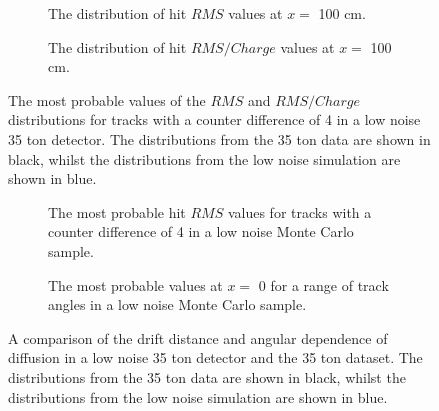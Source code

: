 \begin{figure}[h!]
  \centering
  \begin{subfigure}{0.45\textwidth}
    \centering
    \caption{The distribution of hit $RMS$ values at $x =$ 100 cm.}
  \end{subfigure}
  \hspace{0.08\textwidth}
  \begin{subfigure}{0.45\textwidth}
    \centering
    \caption{The distribution of hit $RMS/Charge$ values at $x =$ 100 cm.}
  \end{subfigure}
  \caption[The most probable values of the $RMS$ and $RMS/Charge$ distributions for tracks with a counter difference of 4 in a low noise 35 ton detector]
          {The most probable values of the $RMS$ and $RMS/Charge$ distributions for tracks with a counter difference of 4 in a low noise 35 ton detector. The distributions from the 35 ton data are shown in black, whilst the distributions from the low noise simulation are shown in blue.}
          \label{fig:DiffMCHitFit}
\end{figure}

\begin{figure}[h!]
  \centering
  \begin{subfigure}{0.45\textwidth}
    \centering
    \caption{The most probable hit $RMS$ values for tracks with a counter difference of 4 in a low noise Monte Carlo sample.}
    \label{fig:DiffMCDataCompFit}
  \end{subfigure}
  \hspace{0.08\textwidth}
  \begin{subfigure}{0.45\textwidth}
    \centering
    \caption{The most probable values at $x = $ 0 for a range of track angles in a low noise Monte Carlo sample.}
    \label{fig:DiffMCDataCompInt}
  \end{subfigure}
  \caption[Comparison of the drift distance and angular dependence of diffusion in a low noise 35 ton detector and the 35 ton dataset]
          {A comparison of the drift distance and angular dependence of diffusion in a low noise 35 ton detector and the 35 ton dataset. The distributions from the 35 ton data are shown in black, whilst the distributions from the low noise simulation are shown in blue.}
          \label{fig:DiffMCDataComp}
\end{figure}

